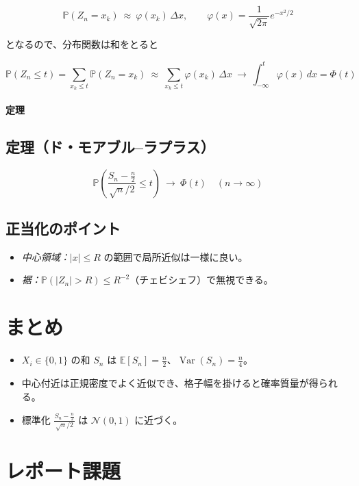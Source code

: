 \documentclass[uplatex,dvipdfmx,11pt,a4paper,openany]{bxjsbook}
\begin{document}
\[\mathbb P(Z_n=x_k)\ \approx\ \varphi(x_k)\,\Delta x,\qquad \varphi(x)=\frac{1}{\sqrt{2\pi}}e^{-x^2/2}\]

となるので、分布関数は和をとると

\[\mathbb P(Z_n\le t)=\sum_{x_k\le t}\mathbb P(Z_n=x_k)\ \approx\ \sum_{x_k\le t}\varphi(x_k)\,\Delta x\ \to\ \int_{-\infty}^t\varphi(x)\,dx=\Phi(t)\]

\paragraph{定理}
\subsection{定理（ド・モアブル–ラプラス）}
\[\boxed{\ \mathbb P\!\left(\frac{S_n-\tfrac{n}{2}}{\sqrt{n}/2}\le t\right)\ \longrightarrow\ \Phi(t)\quad (n\to\infty)\ }\]


\subsection{正当化のポイント}
\begin{itemize}
\item \emph{中心領域：}$|x|\le R$ の範囲で局所近似は一様に良い。
\item \emph{裾：}$\mathbb P(|Z_n|>R)\le R^{-2}$（チェビシェフ）で無視できる。
\end{itemize}

\section{まとめ}
\begin{itemize}
\item $X_i\in\{0,1\}$ の和 $S_n$ は $\mathbb E[S_n]=\tfrac{n}{2}$、$\operatorname{Var}(S_n)=\tfrac{n}{4}$。
\item 中心付近は正規密度でよく近似でき、格子幅を掛けると確率質量が得られる。
\item 標準化 $\displaystyle \frac{S_n-\tfrac{n}{2}}{\sqrt n/2}$ は $\mathcal N(0,1)$ に近づく。
\end{itemize}

\section{レポート課題}
\end{document}
